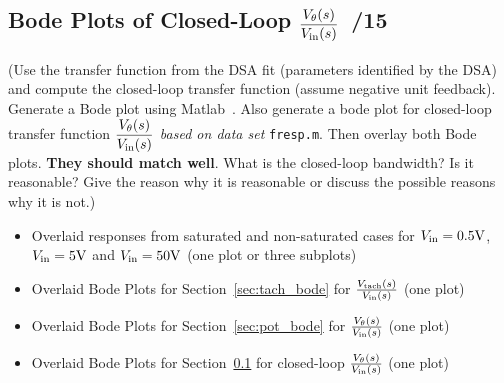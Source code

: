 \documentclass{article}
\newcommand{\score}{\hfill \underline{\hspace{0.65cm}}\,/} %
\newcommand\RR{\textsuperscript{\textregistered}~} %
\begin{document}
\subsection{Bode Plots of Closed-Loop $\displaystyle \frac{V_{\theta}(s)}{V_{\rm in}(s)}$ \score 15}
\label{sec:pot_bode_cl}
(Use the transfer function from the DSA fit (parameters identified by the DSA) and compute the closed-loop transfer function (assume negative unit feedback). Generate a Bode plot using {\sc Matlab}\RR. Also generate a bode plot for closed-loop transfer function $\displaystyle \frac{V_{\theta}(s)}{V_{\rm in}(s)}$ \emph{based on data set} \texttt{fresp.m}. Then overlay both Bode plots. {\bf They should match well}. What is the closed-loop bandwidth? Is it reasonable? Give the reason why it is reasonable or discuss the possible reasons why it is not.)
\newline \\[3mm]
\begin{itemize}
\item Overlaid responses from saturated and non-saturated cases for $V_{\rm in} =0.5\si{\volt}$, $V_{\rm in} =5\si{\volt}$ and $V_{\rm in} =50\si{\volt}$ (one plot or three subplots)
\item Overlaid Bode Plots for Section~\ref{sec:tach_bode} for $ \frac{V_{\rm tach}(s)}{V_{\rm in}(s)}$ (one plot)
\item Overlaid Bode Plots for Section~\ref{sec:pot_bode} for $ \frac{V_{\theta}(s)}{V_{\rm in}(s)}$ (one plot)
\item Overlaid Bode Plots for Section~\ref{sec:pot_bode_cl} for closed-loop $ \frac{V_{\theta}(s)}{V_{\rm in}(s)}$ (one plot)
\end{itemize} 

\end{document}
